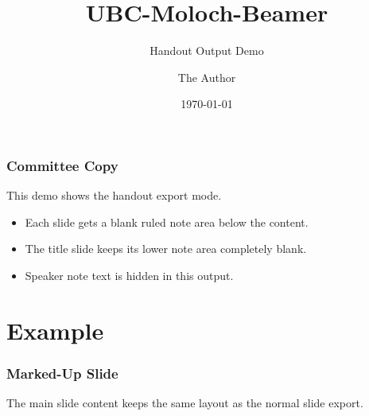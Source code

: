 \documentclass[aspectratio=169,11pt]{beamer}
\title{UBC-Moloch-Beamer}
\subtitle{Handout Output Demo}
\author{The Author}
\institute{The University of British Columbia}
\date{\today}
\begin{document}
\UBCTitlePage[variant=light]

\begin{frame}
  \frametitle{Committee Copy}
  This demo shows the handout export mode.
  \begin{itemize}
    \item Each slide gets a blank ruled note area below the content.
    \item The title slide keeps its lower note area completely blank.
    \item Speaker note text is hidden in this output.
  \end{itemize}
\end{frame}

\section{Example}

\begin{frame}
  \frametitle{Marked-Up Slide}
  The main slide content keeps the same layout as the normal slide export.
\end{frame}
\end{document}
